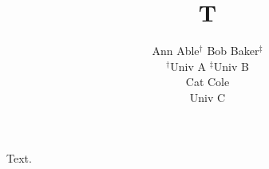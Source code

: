 \documentclass{article}
\title{T}
\author{Ann Able$^{\dagger}$ \quad Bob Baker$^{\ddagger}$ \\ $^\dagger$Univ A \quad $^\ddagger$Univ B \\ Cat Cole \\ Univ C}
\begin{document}
\maketitle
Text.
\end{document}

